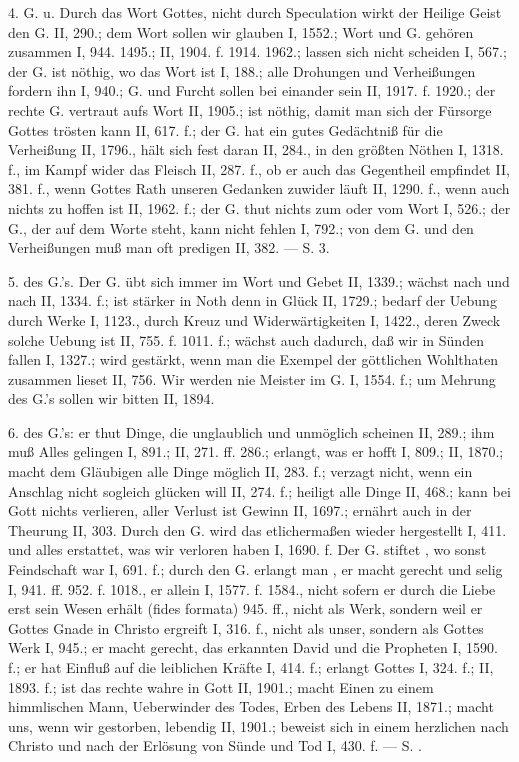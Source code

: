 4.  G. u.  Durch das Wort Gottes, nicht durch Speculation wirkt der Heilige Geist den G. II, 290.; dem Wort sollen wir glauben I, 1552.; Wort und G. gehören zusammen I, 944. 1495.; II, 1904. f. 1914. 1962.; lassen sich nicht scheiden I, 567.; der G. ist nöthig, wo das Wort ist I, 188.; alle Drohungen und Verheißungen fordern ihn I, 940.; G. und Furcht sollen bei einander sein II, 1917. f. 1920.; der rechte G. vertraut aufs Wort II, 1905.; ist nöthig, damit man sich der Fürsorge Gottes trösten kann II, 617. f.; der G. hat ein gutes Gedächtniß für die Verheißung II, 1796., hält sich fest daran II, 284., in den größten Nöthen I, 1318. f., im Kampf wider das Fleisch II, 287. f., ob er auch das Gegentheil empfindet II, 381. f., wenn Gottes Rath unseren Gedanken zuwider läuft II, 1290. f., wenn auch nichts zu hoffen ist II, 1962. f.; der G. thut nichts zum oder vom Wort I, 526.; der G., der auf dem Worte steht, kann nicht fehlen I, 792.; von dem G. und den Verheißungen muß man oft predigen II, 382. — S.  3.

5.  des G.’s. Der G. übt sich immer im Wort und Gebet II, 1339.; wächst nach und nach II, 1334. f.; ist stärker in Noth denn in Glück II, 1729.; bedarf der Uebung durch Werke I, 1123., durch Kreuz und Widerwärtigkeiten I, 1422., deren Zweck solche Uebung ist II, 755. f. 1011. f.; wächst auch dadurch, daß wir in Sünden fallen I, 1327.; wird gestärkt, wenn man die Exempel der göttlichen Wohlthaten zusammen lieset II, 756. Wir werden nie Meister im G. I, 1554. f.; um Mehrung des G.’s sollen wir bitten II, 1894.

6.  des G.’s: er thut Dinge, die unglaublich und unmöglich scheinen II, 289.; ihm muß Alles gelingen I, 891.; II, 271. ff. 286.; erlangt, was er hofft I, 809.; II, 1870.; macht dem Gläubigen alle Dinge möglich II, 283. f.; verzagt nicht, wenn ein Anschlag nicht sogleich glücken will II, 274. f.; heiligt alle Dinge II, 468.; kann bei Gott nichts verlieren,
aller Verlust ist Gewinn II, 1697.; ernährt auch in der Theurung II, 303. Durch den G. wird das  etlichermaßen wieder hergestellt I, 411. und alles erstattet, was wir verloren haben I, 1690. f. Der G. stiftet , wo sonst Feindschaft war I, 691. f.; durch den G. erlangt man , er macht gerecht und selig I, 941. ff. 952. f. 1018., er allein I, 1577. f. 1584., nicht sofern er durch die Liebe erst sein Wesen erhält (fides formata) 945. ff., nicht als Werk, sondern weil er Gottes Gnade in Christo ergreift I, 316. f., nicht als unser, sondern als Gottes Werk I, 945.; er macht gerecht, das erkannten David und die Propheten I, 1590. f.; er hat Einfluß auf die leiblichen Kräfte I, 414. f.; erlangt Gottes  I, 324. f.; II, 1893. f.; ist das rechte wahre  in Gott II, 1901.; macht Einen zu einem himmlischen Mann, Ueberwinder des Todes, Erben des Lebens II, 1871.; macht uns, wenn wir gestorben, lebendig II, 1901.; beweist sich in einem herzlichen  nach Christo und nach der Erlösung von Sünde und Tod I, 430. f. — S. .

